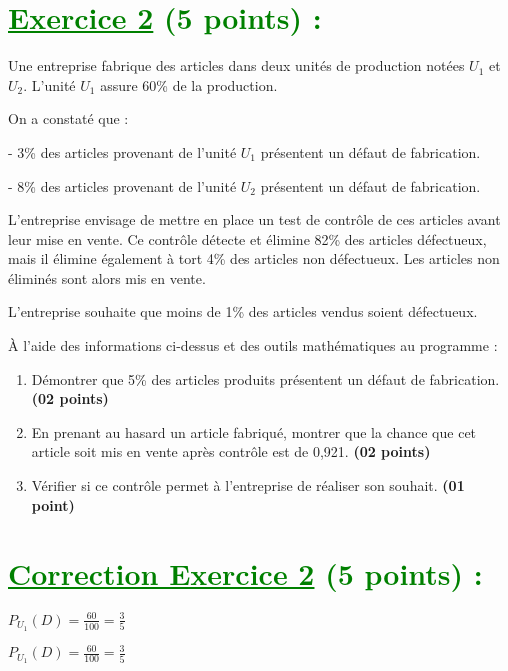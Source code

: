 \documentclass[12pt]{article}
\begin{document}
\section*{\textcolor{green}{\underline{Exercice 2} (5 points) :}}

Une entreprise fabrique des articles dans deux unités de production notées \( U_1 \) et \( U_2 \). L’unité \( U_1 \) assure 60\% de la production.

On a constaté que :

- 3\% des articles provenant de l’unité \( U_1 \) présentent un défaut de fabrication.

- 8\% des articles provenant de l’unité \( U_2 \) présentent un défaut de fabrication.

L’entreprise envisage de mettre en place un test de contrôle de ces articles avant leur mise en vente. Ce contrôle détecte et élimine 82\% des articles défectueux, mais il élimine également à tort 4\% des articles non défectueux. Les articles non éliminés sont alors mis en vente.

L’entreprise souhaite que moins de 1\% des articles vendus soient défectueux.

À l’aide des informations ci-dessus et des outils mathématiques au programme :
\begin{enumerate}
    \item Démontrer que 5\% des articles produits présentent un défaut de fabrication. \textbf{(02 points)}
    \item En prenant au hasard un article fabriqué, montrer que la chance que cet article soit mis en vente après contrôle est de 0,921. \textbf{(02 points)}
    \item Vérifier si ce contrôle permet à l’entreprise de réaliser son souhait. \textbf{(01 point)}
\end{enumerate}

\section*{\textcolor{green}{\underline{Correction Exercice 2} (5 points) :}}
$P_{U_{1}}(D)=\frac{60}{100}=\frac{3}{5}$

$P_{U_{1}}(D)=\frac{60}{100}=\frac{3}{5}$
\end{document}
